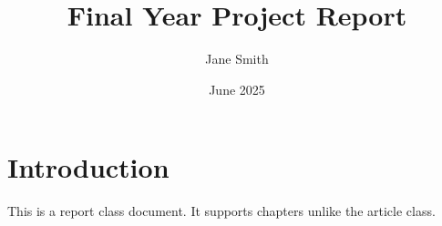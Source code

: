 \documentclass[11pt]{report}
\begin{document}
\title{Final Year Project Report}
\author{Jane Smith}
\date{June 2025} 

\maketitle

\chapter{Introduction}
This is a report class document. It supports chapters unlike the article class.
\end{document}
